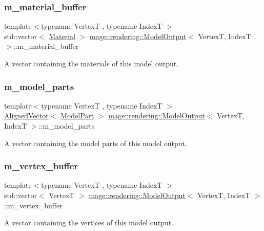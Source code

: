 \subsubsection{\texorpdfstring{m\+\_\+material\+\_\+buffer}{m\_material\_buffer}}
{\footnotesize\ttfamily template$<$typename VertexT , typename IndexT $>$ \\
std\+::vector$<$ \hyperlink{classmage_1_1rendering_1_1_material}{Material} $>$ \hyperlink{structmage_1_1rendering_1_1_model_output}{mage\+::rendering\+::\+Model\+Output}$<$ VertexT, IndexT $>$\+::m\+\_\+material\+\_\+buffer}

A vector containing the materials of this model output. \hypertarget{structmage_1_1rendering_1_1_model_output_a18da9c959800d0331488351612e25df2}{}\label{structmage_1_1rendering_1_1_model_output_a18da9c959800d0331488351612e25df2} 
\subsubsection{\texorpdfstring{m\+\_\+model\+\_\+parts}{m\_model\_parts}}
{\footnotesize\ttfamily template$<$typename VertexT , typename IndexT $>$ \\
\hyperlink{namespacemage_a8664bfb5ce2179fc64eae9f82c8a5ba8}{Aligned\+Vector}$<$ \hyperlink{structmage_1_1rendering_1_1_model_part}{Model\+Part} $>$ \hyperlink{structmage_1_1rendering_1_1_model_output}{mage\+::rendering\+::\+Model\+Output}$<$ VertexT, IndexT $>$\+::m\+\_\+model\+\_\+parts}

A vector containing the model parts of this model output. \hypertarget{structmage_1_1rendering_1_1_model_output_a397e9daee731bb89683daa68bd4acd0f}{}\label{structmage_1_1rendering_1_1_model_output_a397e9daee731bb89683daa68bd4acd0f} 
\subsubsection{\texorpdfstring{m\+\_\+vertex\+\_\+buffer}{m\_vertex\_buffer}}
{\footnotesize\ttfamily template$<$typename VertexT , typename IndexT $>$ \\
std\+::vector$<$ VertexT $>$ \hyperlink{structmage_1_1rendering_1_1_model_output}{mage\+::rendering\+::\+Model\+Output}$<$ VertexT, IndexT $>$\+::m\+\_\+vertex\+\_\+buffer}

A vector containing the vertices of this model output. 